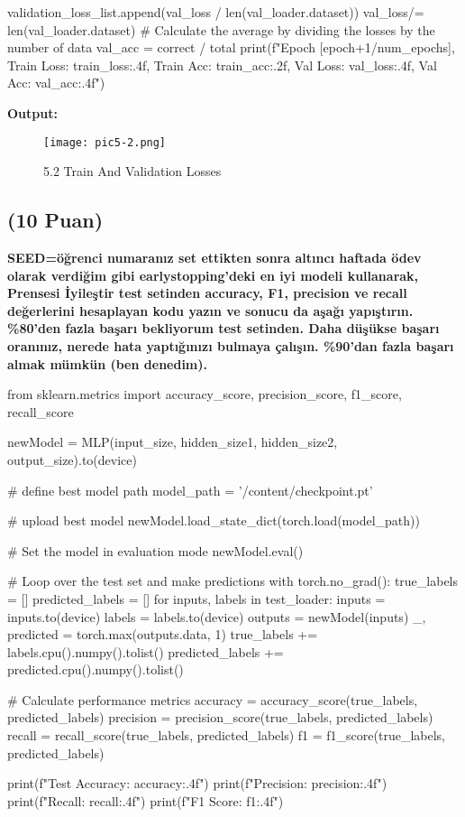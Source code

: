 \documentclass[11pt]{article}
\begin{document}
\begin{python}
        validation_loss_list.append(val_loss / len(val_loader.dataset))
        val_loss/= len(val_loader.dataset) # Calculate the average by dividing the losses by the number of data
        val_acc = correct / total
        print(f"Epoch [{epoch+1}/{num_epochs}], Train Loss: {train_loss:.4f}, Train Acc: {train_acc:.2f}, Val Loss: {val_loss:.4f}, Val Acc: {val_acc:.4f}")
     
\end{python}

\textbf{Output:} 
\begin{figure}[ht!]
    \centering
    \texttt{[image: pic5-2.png]}
    \caption{5.2 Train And Validation Losses}
    \label{fig:my_pic}
\end{figure}
\newpage
\subsection{(10 Puan)} \textbf{SEED=öğrenci numaranız set ettikten sonra altıncı haftada ödev olarak verdiğim gibi earlystopping'deki en iyi modeli kullanarak, Prensesi İyileştir test setinden accuracy, F1, precision ve recall değerlerini hesaplayan kodu yazın ve sonucu da aşağı yapıştırın. \%80'den fazla başarı bekliyorum test setinden. Daha düşükse başarı oranınız, nerede hata yaptığınızı bulmaya çalışın. \%90'dan fazla başarı almak mümkün (ben denedim).}

\begin{python}
from sklearn.metrics import accuracy_score, precision_score, f1_score, recall_score

newModel = MLP(input_size, hidden_size1, hidden_size2, output_size).to(device)

# define best model path
model_path = '/content/checkpoint.pt'

# upload best model
newModel.load_state_dict(torch.load(model_path))

# Set the model in evaluation mode
newModel.eval()

# Loop over the test set and make predictions
with torch.no_grad():
    true_labels = []
    predicted_labels = []
    for inputs, labels in test_loader:
        inputs = inputs.to(device)
        labels = labels.to(device)
        outputs = newModel(inputs)
        _, predicted = torch.max(outputs.data, 1)
        true_labels += labels.cpu().numpy().tolist()
        predicted_labels += predicted.cpu().numpy().tolist()

# Calculate performance metrics
accuracy = accuracy_score(true_labels, predicted_labels)
precision = precision_score(true_labels, predicted_labels)
recall = recall_score(true_labels, predicted_labels)
f1 = f1_score(true_labels, predicted_labels)

print(f"Test Accuracy: {accuracy:.4f}")
print(f"Precision: {precision:.4f}")
print(f"Recall: {recall:.4f}")
print(f"F1 Score: {f1:.4f}")
\end{python}
\end{document}
